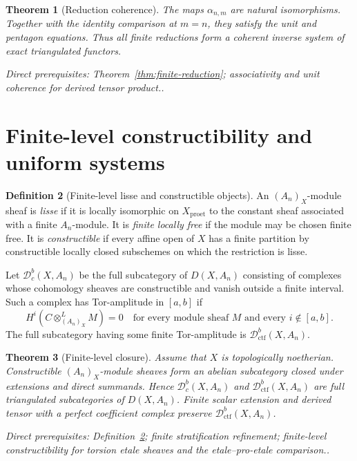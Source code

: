 \documentclass[10pt]{article}
\newtheorem{theorem}{Theorem}[section]
\theoremstyle{definition}
\newtheorem{definition}[theorem]{Definition}
\newcommand{\Dbc}{\mathcal D^b_c}
\newcommand{\Dctf}{\mathcal D^b_{\mathrm{ctf}}}
\newcommand{\depends}[1]{\par\smallskip\noindent\textit{Direct prerequisites:} #1.}
\begin{document}
\begin{theorem}[Reduction coherence]\label{thm:reduction-coherence}
The maps $\alpha_{n,m}$ are natural isomorphisms.  Together with the
identity comparison at $m=n$, they satisfy the unit and pentagon equations.
Thus all finite reductions form a coherent inverse system of exact
triangulated functors.
\depends{Theorem~\ref{thm:finite-reduction}; associativity and unit
coherence for derived tensor product.}
\end{theorem}

\section{Finite-level constructibility and uniform systems}

\begin{definition}[Finite-level lisse and constructible objects]
\label{def:finite-constructible}
An $(A_n)_X$-module sheaf is \emph{lisse} if it is locally isomorphic on
$X_{\mathrm{proet}}$ to the constant sheaf associated with a finite
$A_n$-module.  It is \emph{finite locally free} if the module may be chosen
finite free.  It is \emph{constructible} if every affine open of $X$ has a
finite partition by constructible locally closed subschemes on which the
restriction is lisse.

Let $\Dbc(X,A_n)$ be the full subcategory of $D(X,A_n)$ consisting of
complexes whose cohomology sheaves are constructible and vanish outside a
finite interval.  Such a complex has Tor-amplitude in $[a,b]$ if
\[
 H^i(C\otimes^L_{(A_n)_X}M)=0
 \quad\text{for every module sheaf $M$ and every $i\notin[a,b]$}.
\]
The full subcategory having some finite Tor-amplitude is
$\Dctf(X,A_n)$.
\end{definition}

\begin{theorem}[Finite-level closure]\label{thm:finite-closure}
Assume that $X$ is topologically noetherian.  Constructible
$(A_n)_X$-module sheaves form an abelian subcategory closed under extensions
and direct summands.  Hence $\Dbc(X,A_n)$ and $\Dctf(X,A_n)$ are full
triangulated subcategories of $D(X,A_n)$.  Finite scalar extension and
derived tensor with a perfect coefficient complex preserve
$\Dctf(X,A_n)$.
\depends{Definition~\ref{def:finite-constructible}; finite stratification
refinement; finite-level constructibility for torsion etale sheaves and the
etale--pro-etale comparison.}
\end{theorem}
\end{document}
